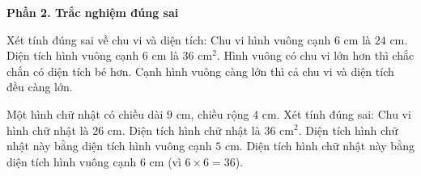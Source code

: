 \textbf{Phần 2. Trắc nghiệm đúng sai}

\begin{ex} %
Xét tính đúng sai về chu vi và diện tích:
\choiceTF
{\True Chu vi hình vuông cạnh $6\text{ cm}$ là $24\text{ cm}$.}
{\True Diện tích hình vuông cạnh $6\text{ cm}$ là $36\text{ cm}^2$.}
{Hình vuông có chu vi lớn hơn thì chắc chắn có diện tích bé hơn.}
{\True Cạnh hình vuông càng lớn thì cả chu vi và diện tích đều càng lớn.}
\end{ex}

\begin{ex} %
Một hình chữ nhật có chiều dài $9\text{ cm}$, chiều rộng $4\text{ cm}$. Xét tính đúng sai:
\choiceTF
{\True Chu vi hình chữ nhật là $26\text{ cm}$.}
{\True Diện tích hình chữ nhật là $36\text{ cm}^2$.}
{Diện tích hình chữ nhật này bằng diện tích hình vuông cạnh $5\text{ cm}$.}
{\True Diện tích hình chữ nhật này bằng diện tích hình vuông cạnh $6\text{ cm}$ (vì $6 \times 6 = 36$).}
\end{ex}

